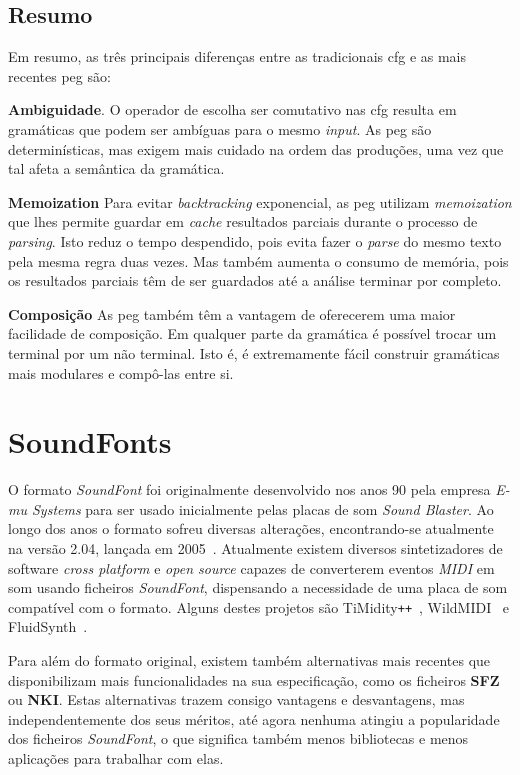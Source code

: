 
\subsection{Resumo}
Em resumo, as três principais diferenças entre as tradicionais \acrfull{cfg} e as mais recentes \acrfull{peg} são:

\textbf{Ambiguidade}. O operador de escolha ser comutativo nas \acrshort{cfg} resulta em gramáticas que podem ser ambíguas para o mesmo \textit{input}. As \acrshort{peg} são determinísticas, mas exigem mais cuidado na ordem das produções, uma vez que tal afeta a semântica da gramática.

\textbf{Memoization} Para evitar \textit{backtracking} exponencial, as \acrshort{peg} utilizam \textit{memoization} que lhes permite guardar em \textit{cache} resultados parciais durante o processo de \textit{parsing}. Isto reduz o tempo despendido, pois evita fazer o \textit{parse} do mesmo texto pela mesma regra duas vezes. Mas também aumenta o consumo de memória, pois os resultados parciais têm de ser guardados até a análise terminar por completo.

\textbf{Composição} As \acrlong{peg} também têm a vantagem de oferecerem uma maior facilidade de composição. Em qualquer parte da gramática é possível trocar um terminal por um não terminal. Isto é, é extremamente fácil construir gramáticas mais modulares e compô-las entre si.

\section{SoundFonts}
O formato \textit{SoundFont} foi originalmente desenvolvido nos anos 90 pela empresa \textit{E-mu Systems} para ser usado inicialmente pelas placas de som \textit{Sound Blaster}. Ao longo dos anos o formato sofreu diversas alterações, encontrando-se atualmente na versão 2.04, lançada em 2005~\cite{soundfont}. Atualmente existem diversos sintetizadores de software \textit{cross platform} e \textit{open source} capazes de converterem eventos \textit{MIDI} em som usando ficheiros \textit{SoundFont}, dispensando a necessidade de uma placa de som compatível com o formato. Alguns destes projetos são TiMidity\verb|++|~\cite{timidity}, WildMIDI~\cite{wild-midi} e FluidSynth~\cite{fluidsynth}.


Para além do formato original, existem também alternativas mais recentes que disponibilizam mais funcionalidades na sua especificação, como os ficheiros \textbf{SFZ} ou \textbf{NKI}. Estas alternativas trazem consigo vantagens e desvantagens, mas independentemente dos seus méritos, até agora nenhuma atingiu a popularidade dos ficheiros \textit{SoundFont}, o que significa também menos bibliotecas e menos aplicações para trabalhar com elas.

